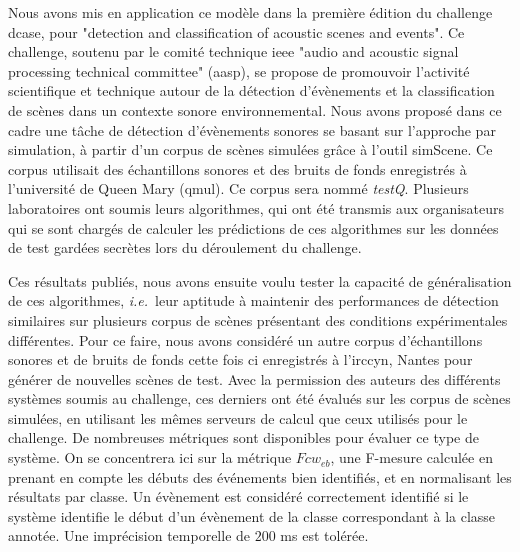 %         

Nous avons mis en application ce modèle dans la première édition du challenge dcase, pour "detection and classification of acoustic scenes and events". Ce challenge, soutenu par le comité technique ieee "audio and acoustic signal processing technical committee" (aasp), se propose de promouvoir l'activité scientifique et technique autour de la détection d'évènements et la classification de scènes dans un contexte sonore environnemental. Nous avons proposé dans ce cadre une tâche de détection d'évènements sonores se basant sur l'approche par simulation, à partir d'un corpus de scènes simulées grâce à l'outil simScene. Ce corpus utilisait des échantillons sonores et des bruits de fonds enregistrés à l'université de Queen Mary (qmul). Ce corpus sera nommé \emph{testQ}. Plusieurs laboratoires ont soumis leurs algorithmes, qui ont été transmis aux organisateurs qui se sont chargés de calculer les prédictions de ces algorithmes sur les données de test gardées secrètes lors du déroulement du challenge.

Ces résultats publiés\cite{stowellhal-01253912}, nous avons ensuite voulu tester la capacité de généralisation de ces algorithmes, \textit{i.e.}~leur aptitude à maintenir des performances de détection similaires sur plusieurs corpus de scènes présentant des conditions expérimentales différentes. Pour ce faire, nous avons considéré un autre corpus d'échantillons sonores et de bruits de fonds  cette fois ci enregistrés à l'irccyn, Nantes pour générer de nouvelles scènes de test. Avec la permission des auteurs des différents systèmes soumis au challenge, ces derniers ont été évalués sur les corpus de scènes simulées, en utilisant les mêmes serveurs de calcul que ceux utilisés pour le challenge. De nombreuses métriques sont disponibles pour évaluer ce type de système. On se concentrera ici sur la métrique $Fcw_{eb}$, une F-mesure calculée en prenant en compte les débuts des événements bien identifiés, et en normalisant les résultats par classe. Un évènement est considéré correctement identifié si le système identifie le début d'un évènement de la classe correspondant à la classe annotée. Une imprécision temporelle de $200$ ms est tolérée.



